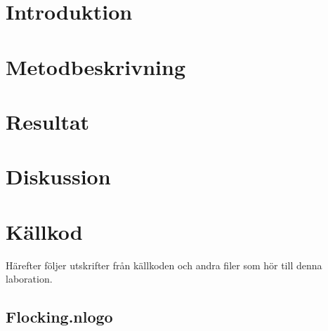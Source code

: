 \documentclass[titlepage, a4paper, 12pt]{article}
\begin{document}
\section{Introduktion}

\section{Metodbeskrivning}

\section{Resultat}
\section{Diskussion}




\newpage
\appendix
{}
\section{Källkod}\label{sec:kallkod}
Härefter följer utskrifter från källkoden och andra filer som hör till
denna laboration.

\subsection{Flocking.nlogo}\label{app:Flocking.nlogo}
\begin{footnotesize}
  
\end{footnotesize}
\end{document}
